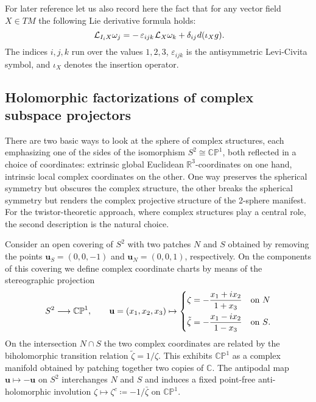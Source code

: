 \documentclass[11pt]{amsart}
\theoremstyle{remark}
\theoremstyle{remark}
\theoremstyle{definition}
\theoremstyle{definition}
\theoremstyle{definition}
\newcommand{\0}{{\scriptstyle 0'}} %
\newcommand{\1}{{\scriptstyle 1'}}
\newcommand{\pt}{\hspace{1pt}} %
\newcommand{\hp}{\hspace{0.5pt}} %
\begin{document}
For later reference let us also record here the fact that for any vector field \mbox{$X \in TM$} the following Lie derivative formula holds:
\begin{equation} \label{HK_formula}
\mathcal{L}_{I_iX} \omega_j = - \, \varepsilon_{ijk} \pt \mathcal{L}_X \omega_k + \delta_{ij} \hp d(\iota_X g) \rlap{.}
\end{equation}
The indices $i,j,k$ run over the values $1,2,3$, $\varepsilon_{ijk}$ is the antisymmetric Levi-Civita symbol, and $\iota_X$ denotes the insertion operator. 


\subsection{Holomorphic factorizations of complex subspace projectors}  \label{ssec:proj_hol_fact} \hfill \medskip


There are two basic ways to look at the sphere of complex structures, each emphasizing one of the sides of the isomorphism $S^2 \cong \mathbb{CP}^1$, both reflected in a choice of coordinates: extrinsic global Euclidean $\mathbb{R}^3$-coordinates on one hand, intrinsic local complex coordinates on the other. One way preserves the spherical symmetry but obscures the complex structure, the other breaks the spherical symmetry but renders the complex projective structure of the 2-sphere manifest. For the twistor-theoretic approach, where complex structures play a central role, the second description is the natural choice.

Consider an open covering of $S^2$ with two patches $N$ and $S$ obtained by removing the points $\mathbf{u}_S=(0,0,-1)$ and $\mathbf{u}_N=(0,0,1)$, respectively. On the components of this covering we define complex coordinate charts by means of the stereographic projection
\begin{equation} \label{stereo_map}
S^2 \longrightarrow \mathbb{CP}^1, 
\qquad
\mathbf{u} = (x_1, x_2, x_3) \mapsto
\begin{cases}
\displaystyle{\zeta = - \frac{x_1+ix_2}{1+x_3}} & \textrm{on $N$} \\[2ex]
\displaystyle{\tilde{\zeta} = - \frac{x_1-ix_2}{1-x_3}} & \textrm{on $S$} \rlap{.}
\end{cases}
\end{equation}
On the intersection $N \cap S$ the two complex coordinates are related by the biholomorphic transition relation $\tilde{\zeta} = 1/\zeta$. This exhibits $\mathbb{CP}^1$ as a complex manifold obtained by patching together two copies of $\mathbb{C}$. The antipodal map $\mathbf{u} \mapsto - \mathbf{u}$ on $S^2$ interchanges $N$ and $S$ and induces a fixed point-free anti-holomorphic involution $\zeta \mapsto \zeta^c \coloneqq - 1/\bar{\zeta}$ on $\mathbb{CP}^1$. 
\end{document}

